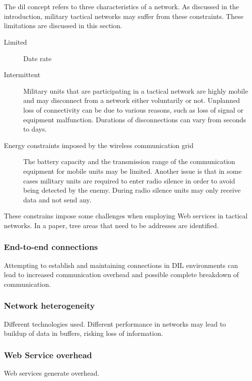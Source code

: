 \documentclass[USenglish]{ifimaster}
\begin{document}
\section{}
\label{dil}
The \gls{dil} concept refers to three characteristics of a network. As discussed
in the introduction, military tactical networks may suffer from these constraints. These limitations are discussed in this section.

\begin{description}
\item[Limited] Date rate
\item[Intermittent] Military units that are participating in a tactical network
are highly mobile and may disconnect from a network either voluntarily or not.
Unplanned loss of connectivity can be due to various reasons, such as loss of
signal or equipment malfunction. Durations of disconnections can vary from
seconds to days.
\item[Energy constraints imposed by the wireless communication grid] The battery
capacity and the transmission range of the communication equipment for mobile
units may be limited. Another issue is that in some cases military units are
required to enter radio silence in order to avoid being detected by the enemy.
During radio silence units may only receive data and not send any.
\end{description}

These constrains impose some challenges when employing Web services in
tactical networks. In a paper, tree areas that need to be addresses are
identified\cite{IST-118}.
\label{section:DIL-problems}

\subsubsection{End-to-end connections}
Attempting to establish and maintaining connections in DIL environments can lead
to increased communication overhead and possible complete breakdown of
communication. \subsubsection{Network heterogeneity}
Different technologies used. Different performance in networks may lead to
buildup of data in buffers, risking loss of information.
\subsubsection{Web Service overhead}
Web services generate overhead.
\end{document}
